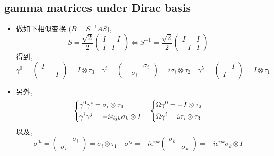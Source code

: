 \subsection{gamma matrices under Dirac basis}
\begin{itemize}
	\item 做如下相似变换 ($B = S^{- 1} A S$),
	\begin{equation} \label{6.1.8}
		S = \frac{\sqrt{2}}{2} \begin{pmatrix}
			I & - I \\
			I & I
		\end{pmatrix} \iff S^{- 1} = \frac{\sqrt{2}}{2} \begin{pmatrix}
			I & I \\
			- I & I
		\end{pmatrix}
	\end{equation}
	得到,
	\begin{equation}
		\gamma^0 = \begin{pmatrix}
			I & \\
			& - I
		\end{pmatrix} = I \otimes \tau_3 \quad \gamma^i = \begin{pmatrix}
			& \sigma_i \\
			- \sigma_i &
		\end{pmatrix} = i \sigma_i \otimes \tau_2 \quad \gamma^5 = \begin{pmatrix}
			& I \\
			I &
		\end{pmatrix} = I \otimes \tau_1
	\end{equation}
	
	\item 另外,
	\begin{equation}
		\begin{dcases}
			\gamma^0 \gamma^i = \sigma_i \otimes \tau_1 \\
			\gamma^i \gamma^j = - i \epsilon_{i j k} \sigma_k \otimes I
		\end{dcases} \quad \begin{dcases}
			\Omega \gamma^0 = - I \otimes \tau_2 \\
			\Omega \gamma^i = i \sigma_i \otimes \tau_3
		\end{dcases}
	\end{equation}
	以及,
	\begin{equation}
		\sigma^{0 i} = \begin{pmatrix}
			& \sigma_i \\
			\sigma_i &
		\end{pmatrix} = \sigma_i \otimes \tau_1 \quad \sigma^{i j} = - i \epsilon^{i j k} \begin{pmatrix}
			\sigma_k & \\
			& \sigma_k
		\end{pmatrix} = - i \epsilon^{i j k} \sigma_k \otimes I
	\end{equation}
\end{itemize}

